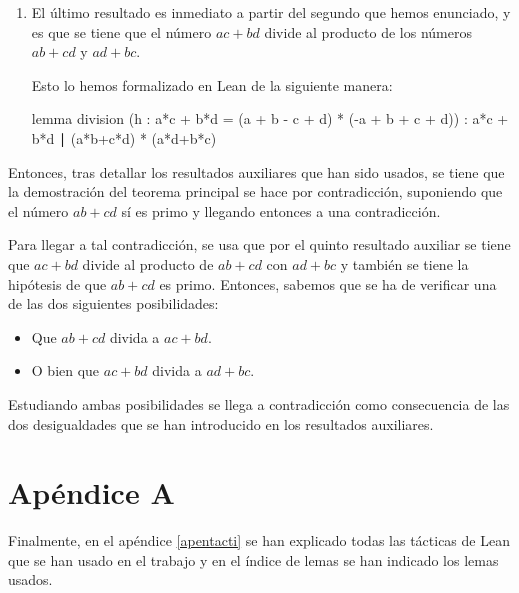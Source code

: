 \begin{enumerate}
\item El último resultado es inmediato a partir del segundo que hemos
  enunciado, y es que se tiene que el número \(ac+bd\) divide al
  producto de los números \(ab+cd\) y \(ad+bc\).

  Esto lo hemos formalizado en Lean de la siguiente manera:

  \begin{leancode}
  lemma division
    (h : a*c + b*d = (a + b - c + d) * (-a + b + c + d))
    : a*c + b*d ∣ (a*b+c*d) * (a*d+b*c)
  \end{leancode}

\end{enumerate}

Entonces, tras detallar los resultados auxiliares que han sido usados,
se tiene que la demostración del teorema principal se hace por
contradicción, suponiendo que el número \(ab+cd\) sí es primo y llegando
entonces a una contradicción.

Para llegar a tal contradicción, se usa que por el quinto resultado
auxiliar se tiene que \(ac+bd\) divide al producto de \(ab+cd\) con
\(ad+bc\) y también se tiene la hipótesis de que \(ab+cd\) es
primo. Entonces, sabemos que se ha de verificar una de las dos
siguientes posibilidades:
\begin{itemize}
\item Que \(ab+cd\) divida a \(ac+bd\).

\item O bien que \(ac+bd\) divida a \(ad+bc\).
\end{itemize}

Estudiando ambas posibilidades se llega a contradicción como
consecuencia de las dos desigualdades que se han introducido en los
resultados auxiliares.

\section*{Apéndice A}

Finalmente, en el apéndice \ref{apentacti} se han explicado todas
las tácticas de Lean que se han usado en el trabajo y en el índice de
lemas se han indicado los lemas usados.



